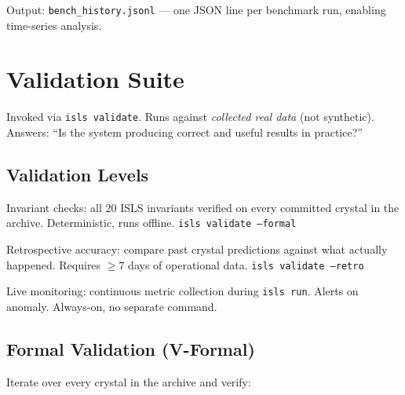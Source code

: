 \documentclass[10pt,a4paper]{article}
\begin{document}
Output: \texttt{bench\_history.jsonl} — one JSON line per benchmark run, enabling time-series analysis.

\section{Validation Suite}
\label{sec:validate}

Invoked via \texttt{isls validate}. Runs against \emph{collected real data} (not synthetic). Answers: ``Is the system producing correct and useful results in practice?''

\subsection{Validation Levels}

\begin{specbox}
\begin{description}[nosep,leftmargin=1.5cm,style=sameline]
\item[V-Formal] Invariant checks: all 20 ISLS invariants verified on every committed crystal in the archive. Deterministic, runs offline. \texttt{isls validate --formal}
\item[V-Retro] Retrospective accuracy: compare past crystal predictions against what actually happened. Requires $\geq 7$ days of operational data. \texttt{isls validate --retro}
\item[V-Live] Live monitoring: continuous metric collection during \texttt{isls run}. Alerts on anomaly. Always-on, no separate command.
\end{description}
\end{specbox}

\subsection{Formal Validation (V-Formal)}

Iterate over every crystal in the archive and verify:
\end{document}
